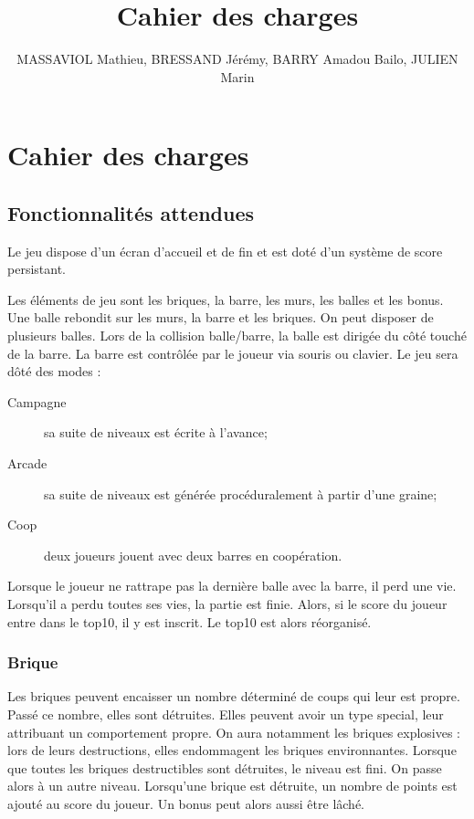  \title{Cahier des charges}
  \author{MASSAVIOL Mathieu, BRESSAND Jérémy, BARRY Amadou Bailo, JULIEN Marin}
  \section{Cahier des charges}
  \subsection{Fonctionnalités attendues}
  
  
  Le jeu dispose d'un écran d'accueil et de fin et est doté d'un système de score persistant.
  
  Les éléments de jeu sont les briques, la barre, les murs, les balles et les bonus.
  Une balle rebondit sur les murs, la barre et les briques. On peut disposer de plusieurs balles.
  Lors de la collision balle/barre, la balle est dirigée du côté touché de la barre.
  La barre est contrôlée par le joueur via souris ou clavier.
  Le jeu sera dôté des modes :
  \begin{description}
    \item[Campagne] sa suite de niveaux est écrite à l'avance;
    \item[Arcade] sa suite de niveaux est générée procéduralement à partir d'une graine;
    \item[Coop] deux joueurs jouent avec deux barres en coopération.
  \end{description}
  Lorsque le joueur ne rattrape pas la dernière balle avec la barre, il perd une vie. Lorsqu'il a perdu toutes ses vies, la partie est finie.
  Alors, si le score du joueur entre dans le top10, il y est inscrit. Le top10 est alors réorganisé.

  \subsubsection{Brique}
  Les briques peuvent encaisser un nombre déterminé de coups qui leur est propre. Passé ce nombre, elles sont détruites.
  Elles peuvent avoir un type special, leur attribuant un comportement propre.
  On aura notamment les briques explosives : lors de leurs destructions, elles endommagent les briques environnantes.
  Lorsque que toutes les briques destructibles sont détruites, le niveau est fini. On passe alors à un autre niveau.
  Lorsqu'une brique est détruite, un nombre de points est ajouté au score du joueur. Un bonus peut alors aussi être lâché.

